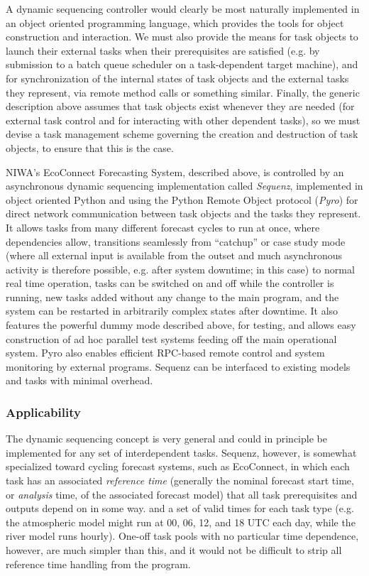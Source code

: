 \documentclass[11pt,a4paper]{article}
\begin{document}
A dynamic sequencing controller would clearly be most naturally
implemented in an object oriented programming language, which provides
the tools for object construction and interaction.  We must also provide
the means for task objects to launch their external tasks when their
prerequisites are satisfied (e.g.  by submission to a batch queue
scheduler on a task-dependent target machine), and for synchronization
of the internal states of task objects and the external tasks they
represent, via remote method calls or something similar.  Finally, the
generic description above assumes that task objects exist whenever they
are needed (for external task control and for interacting with other
dependent tasks), so we must devise a task management scheme governing
the creation and destruction of task objects, to ensure that this is the
case.

NIWA's EcoConnect Forecasting System, described above, is controlled by
an asynchronous dynamic sequencing implementation called {\em Sequenz},
implemented in object oriented Python and using the Python Remote Object
protocol ({\em Pyro}) for direct network communication between task
objects and the tasks they represent. It allows tasks from many
different forecast cycles to run at once, where dependencies allow,
transitions seamlessly from ``catchup'' or case study mode (where all
external input is available from the outset and much asynchronous
activity is therefore possible, e.g. after system downtime; in this
case) to normal real time operation, tasks can be switched on and off
while the controller is running, new tasks added without any change to
the main program, and the system can be restarted in arbitrarily complex
states after downtime.  It also features the powerful dummy mode
described above, for testing, and allows easy construction of ad hoc
parallel test systems feeding off the main operational system. Pyro also
enables efficient RPC-based remote control and system monitoring by
external programs.  Sequenz can be interfaced to existing models and
tasks with minimal overhead. 


\subsubsection{Applicability}

The dynamic sequencing concept is very general and could in principle be
implemented for any set of interdependent tasks. Sequenz, however, is
somewhat specialized toward cycling forecast systems, such as
EcoConnect, in which each task has an associated {\em reference time}
(generally the nominal forecast start time, or {\em analysis} time, of
the associated forecast model) that all task prerequisites and outputs
depend on in some way. and a set of valid times for each task type (e.g.
the atmospheric model might run at 00, 06, 12, and 18 UTC each day,
while the river model runs hourly).  One-off task pools with no
particular time dependence, however, are much simpler than this, and it
would not be difficult to strip all reference time handling from the
program.
\end{document}
